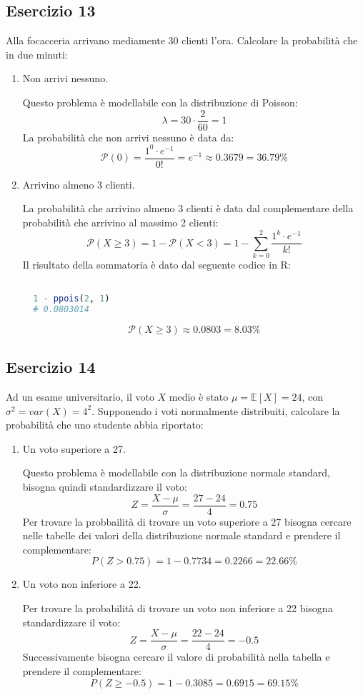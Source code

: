 \documentclass[a4paper]{article}
\theoremstyle{break}
\theoremstyle{break}
\theoremstyle{break}
\theoremstyle{break}
\begin{document}
\subsection{Esercizio 13}
Alla focacceria arrivano mediamente 30 clienti l'ora. Calcolare la probabilità che in
due minuti:
\begin{enumerate}
  \item Non arrivi nessuno.

    \vspace{1em}
    Questo problema è modellabile con la distribuzione di Poisson:
    \[
    \lambda = 30 \cdot \frac{2}{60} = 1
    \] 
    La probabilità che non arrivi nessuno è data da:
    \[
    \mathcal{P}(0) = \frac{1^0 \cdot e^{-1}}{0!} = e^{-1} \approx 0.3679 = 36.79\%
    \] 
  \item Arrivino almeno 3 clienti.

    \vspace{1em}
    La probabilità che arrivino almeno 3 clienti è data dal complementare della probabilità
    che arrivino al massimo 2 clienti:
    \[
    \mathcal{P}(X \ge 3) = 1 - \mathcal{P}(X < 3) = 1 - \sum_{k=0}^{2} \frac{1^k \cdot e^{-1}}{k!}
    \]
    Il risultato della sommatoria è dato dal seguente codice in R:
    \begin{lstlisting}[language=R]

  1 - ppois(2, 1)
  # 0.0803014
    \end{lstlisting}
    \[
    \mathcal{P}(X \ge 3) \approx 0.0803 = 8.03\%
    \]
\end{enumerate}

\subsection{Esercizio 14}
Ad un esame universitario, il voto \( X \) medio è stato \( \mu = \mathbb{E}[X] = 24 \),
con \( \sigma^2 = var(X) = 4^2 \). Supponendo i voti normalmente distribuiti, calcolare
la probabilità che uno studente abbia riportato:
\begin{enumerate}
  \item Un voto superiore a 27.

    \vspace{1em}
    Questo problema è modellabile con la distribuzione normale standard, bisogna quindi
    standardizzare il voto:
    \[
    Z = \frac{X - \mu}{\sigma} = \frac{27 - 24}{4} = 0.75
    \]
    Per trovare la probbailità di trovare un voto superiore a 27 bisogna cercare nelle
    tabelle dei valori della distribuzione normale standard e prendere il complementare:
    \[
    P(Z > 0.75) = 1 - 0.7734 = 0.2266 = 22.66\%
    \] 
  \item Un voto non inferiore a 22.

    \vspace{1em}
    Per trovare la probabilità di trovare un voto non inferiore a 22 bisogna standardizzare
    il voto:
    \[
    Z = \frac{X - \mu}{\sigma} = \frac{22 - 24}{4} = -0.5
    \]
    Successivamente bisogna cercare il valore di probabilità nella tabella e prendere il
    complementare:
    \[
    P(Z \ge -0.5) = 1 - 0.3085 = 0.6915 = 69.15\%
    \] 
\end{enumerate}
\end{document}
